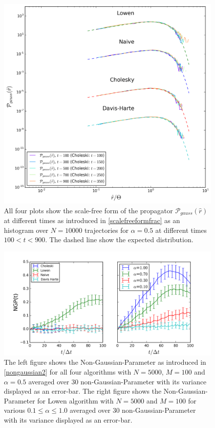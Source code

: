 \documentclass[
  a4paper,BCOR10mm,twoside,
  headsepline,footsepline,%
  fleqn,openbib
]{scrbook}
\begin{document}
\begin{figure}[h!]
\centering
\includegraphics[width=\textwidth]{./data/scaledfunctionneu12.png}
\caption{All four plots show the scale-free form of the propagator $\mathcal{P}_{gauss}(\hat{r})$ at different times as introduced in \cref{scalefreeformfrac} as an histogram over $N=10000$ trajectories for $\alpha=0.5$ at different times $100<t<900$. The dashed line show the expected distribution.}
\label{rescaledfunction}
\end{figure}
\begin{figure}[h]
\centering
\includegraphics[width=\textwidth]{./data/nongaussianlowenalphaneu.png}
\caption{ The left figure shows the Non-Gaussian-Parameter as introduced in \cref{nongaussian2} for all four algorithms with  $N=5000$, $M=100$ and $\alpha=0.5$   averaged over $30$ non-Gaussian-Parameter with its variance displayed as an error-bar.\newline
The right figure shows the Non-Gaussian-Parameter for Lowen algorithm with  $N=5000$ and $M=100$ for various $0.1\leq\alpha\leq1.0$ averaged over $30$ non-Gaussian-Parameter with its variance displayed as an error-bar.}
\label{nongaussianlowen}
\end{figure}
\end{document}
